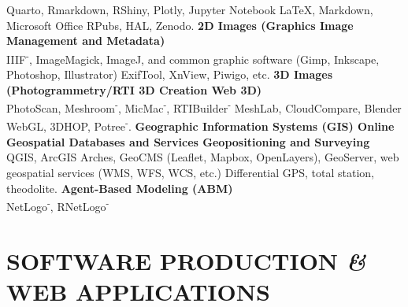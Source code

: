 \documentclass{article}
\newcommand{\fr}[1]{}       %
\newcommand{\en}[1]{#1}     %
\begin{document}
\en{\textsf{Quarto}, \textsf{Rmarkdown}, \textsf{RShiny}, \textsf{Plotly}, \textsf{Jupyter Notebook} \textbf{{\textbar}} \LaTeX, \textsf{Markdown}, Microsoft Office \textbf{{\textbar}} RPubs, HAL, Zenodo.}
\smallbreak
\textbf{\fr{Images 2D (Infographie {\textbar} Gestion et métadonnées des images)}\en{2D Images (Graphics {\textbar} Image Management and Metadata)}} \\
\fr{IIIF\textsuperscript{-}, ImageMagick, ImageJ, et logiciels graphiques courants (Gimp, Inkscape, Photoshop, Illustrator) {\textbar} ExifTool, XnView, Piwigo, etc.}
\en{IIIF\textsuperscript{-}, ImageMagick, ImageJ, and common graphic software (Gimp, Inkscape, Photoshop, Illustrator) {\textbar} ExifTool, XnView, Piwigo, etc.}
\smallbreak
\textbf{\fr{Images 3D (Photogrammétrie/RTI {\textbar} Création 3D {\textbar} Web 3D)}\en{3D Images (Photogrammetry/RTI {\textbar} 3D Creation {\textbar} Web 3D)}} \\
\fr{PhotoScan, Meshroom\textsuperscript{-}, MicMac\textsuperscript{-}, RTIBuilder\textsuperscript{-} {\textbar} MeshLab, CloudCompare, Blender \textbf{{\textbar}} WebGL, 3DHOP, Potree\textsuperscript{-}.}
\en{PhotoScan, Meshroom\textsuperscript{-}, MicMac\textsuperscript{-}, RTIBuilder\textsuperscript{-} {\textbar} MeshLab, CloudCompare, Blender \textbf{{\textbar}} WebGL, 3DHOP, Potree\textsuperscript{-}.}
\smallbreak
\textbf{\fr{Systèmes d'information géographique (SIG) {\textbar} Bases de données et services géospatiaux en ligne {\textbar} Géopositionnement et topographie}\en{Geographic Information Systems (GIS) {\textbar} Online Geospatial Databases and Services {\textbar} Geopositioning and Surveying}} \\
\fr{QGIS, ArcGIS {\textbar} Arches, GeoCMS (\textsf{Leaflet}, \textsf{Mapbox}, \textsf{OpenLayers}), GeoServer, services géospatiaux web (WMS, WFS, WCS, etc.) {\textbar} GPS différentiel, station totale, théodolite.}
\en{QGIS, ArcGIS {\textbar} Arches, GeoCMS (\textsf{Leaflet}, \textsf{Mapbox}, \textsf{OpenLayers}), GeoServer, web geospatial services (WMS, WFS, WCS, etc.) {\textbar} Differential GPS, total station, theodolite.}
\smallbreak
\textbf{\fr{Modélisation basée sur les agents (ABM)}\en{Agent-Based Modeling (ABM)}} \\
\fr{NetLogo\textsuperscript{-}, \textsf{RNetLogo\textsuperscript{-}}}
\en{NetLogo\textsuperscript{-}, \textsf{RNetLogo\textsuperscript{-}}}
\smallbreak


\section{\fr{PRODUCTION LOGICIELLE \textit{\&} APPLICATIONS WEB}\en{SOFTWARE PRODUCTION \textit{\&} WEB APPLICATIONS}}
\end{document}
